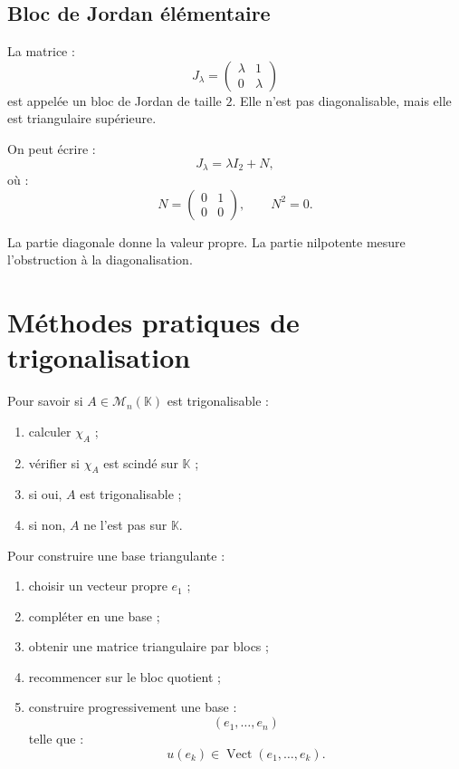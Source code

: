 \documentclass[11pt,a4paper]{article}
\newcommand{\K}{\mathbb K}
\newcommand{\M}{\mathcal M}
\newcommand{\Vect}{\operatorname{Vect}}
\begin{document}
\subsection{Bloc de Jordan élémentaire}

La matrice :
\[
J_\lambda=
\begin{pmatrix}
\lambda&1\\
0&\lambda
\end{pmatrix}
\]
est appelée un bloc de Jordan de taille \(2\).  
Elle n'est pas diagonalisable, mais elle est triangulaire supérieure.

On peut écrire :
\[
J_\lambda=\lambda I_2+N,
\]
où :
\[
N=
\begin{pmatrix}
0&1\\
0&0
\end{pmatrix},
\qquad
N^2=0.
\]

\begin{retenirbox}
La partie diagonale donne la valeur propre.  
La partie nilpotente mesure l'obstruction à la diagonalisation.
\end{retenirbox}

\section{Méthodes pratiques de trigonalisation}

\begin{methodbox}
Pour savoir si \(A\in\M_n(\K)\) est trigonalisable :
\begin{enumerate}
    \item calculer \(\chi_A\) ;
    \item vérifier si \(\chi_A\) est scindé sur \(\K\) ;
    \item si oui, \(A\) est trigonalisable ;
    \item si non, \(A\) ne l'est pas sur \(\K\).
\end{enumerate}
\end{methodbox}

\begin{methodbox}
Pour construire une base triangulante :
\begin{enumerate}
    \item choisir un vecteur propre \(e_1\) ;
    \item compléter en une base ;
    \item obtenir une matrice triangulaire par blocs ;
    \item recommencer sur le bloc quotient ;
    \item construire progressivement une base :
    \[
    (e_1,\dots,e_n)
    \]
    telle que :
    \[
    u(e_k)\in\Vect(e_1,\dots,e_k).
    \]
\end{enumerate}
\end{methodbox}
\end{document}
